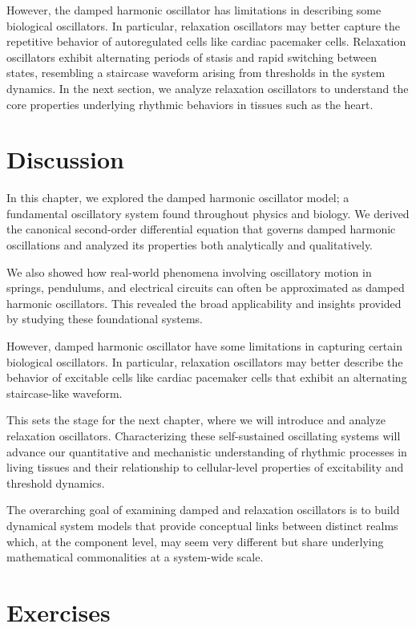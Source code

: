 However, the damped harmonic oscillator has limitations in describing some biological oscillators. In particular, relaxation oscillators may better capture the repetitive behavior of autoregulated cells like cardiac pacemaker cells. Relaxation oscillators exhibit alternating periods of stasis and rapid switching between states, resembling a staircase waveform arising from thresholds in the system dynamics. In the next section, we analyze relaxation oscillators to understand the core properties underlying rhythmic behaviors in tissues such as the heart.

\section{Discussion}

In this chapter, we explored the damped harmonic oscillator model; a fundamental oscillatory system found throughout physics and biology. We derived the canonical second-order differential equation that governs damped harmonic oscillations and analyzed its properties both analytically and qualitatively.

We also showed how real-world phenomena involving oscillatory motion in springs, pendulums, and electrical circuits can often be approximated as damped harmonic oscillators. This revealed the broad applicability and insights provided by studying these foundational systems.

However, damped harmonic oscillator have some limitations in capturing certain biological oscillators. In particular, relaxation oscillators may better describe the behavior of excitable cells like cardiac pacemaker cells that exhibit an alternating staircase-like waveform.

This sets the stage for the next chapter, where we will introduce and analyze relaxation oscillators. Characterizing these self-sustained oscillating systems will advance our quantitative and mechanistic understanding of rhythmic processes in living tissues and their relationship to cellular-level properties of excitability and threshold dynamics.

The overarching goal of examining damped and relaxation oscillators is to build dynamical system models that provide conceptual links between distinct realms which, at the component level, may seem very different but share underlying mathematical commonalities at a system-wide scale.

\section*{Exercises}

